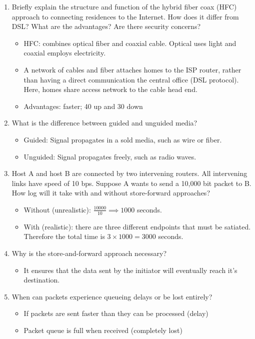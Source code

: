 \documentclass{article}
\begin{document}
\begin{enumerate}
\item Briefly  explain  the structure  and function  of  the  hybrid  fiber  coax (HFC) approach to  connecting residences to  the  Internet. How does it differ from DSL? What are the advantages? Are there security concerns?
\begin{itemize}
\item HFC: combines optical fiber and coaxial cable. Optical uses light and coaxial employs electricity.
\item A network of cables and fiber attaches homes to the ISP router, rather than having a direct communication the central office (DSL protocol). Here, homes share access network to the cable head end.
\item Advantages: faster; 40 up and 30 down
\end{itemize}

\item What is the difference between guided and unguided media?
\begin{itemize}
\item Guided: Signal propagates in a sold media, such as wire or fiber.
\item Unguided: Signal propagates freely, such as radio waves.
\end{itemize}

\item Host A and host B are connected by two intervening routers. All intervening links have speed of 10 bps.  Suppose A wants to send a 10,000 bit packet to B. How log will it take with and without store-forward approaches?
\begin{itemize}
\item Without (unrealistic): $\frac{10000}{10} \implies 1000$ seconds.
\item With (realistic): there are three different endpoints that must be satiated. Therefore the total time is $3 \times 1000 = 3000$ seconds.
\end{itemize}

\item Why is the store-and-forward approach necessary?
\begin{itemize}
\item It ensures that the data sent by the initiator will eventually reach it's destination.
\end{itemize}

\item When can packets experience queueing delays or be lost entirely?
\begin{itemize}
\item If packets are sent faster than they can be processed (delay)
\item Packet queue is full when received (completely lost)
\end{itemize}


\end{enumerate}
\end{document}
